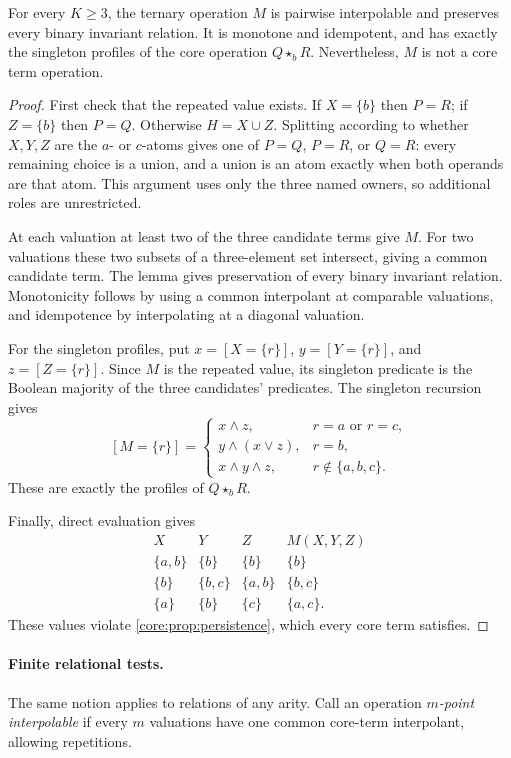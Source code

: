 \begin{theorem}\label{core:thm:pairwise-obstruction}
For every $K\geq3$, the ternary operation $M$ is pairwise interpolable
and preserves every binary invariant relation. It is monotone and
idempotent, and has exactly the singleton profiles of the core operation
$Q\star_bR$. Nevertheless, $M$ is not a core term operation.
\end{theorem}
\begin{proof}
First check that the repeated value exists. If $X=\{b\}$ then $P=R$;
if $Z=\{b\}$ then $P=Q$. Otherwise $H=X\cup Z$. Splitting according
to whether $X,Y,Z$ are the $a$- or $c$-atoms gives one of $P=Q$,
$P=R$, or $Q=R$: every remaining choice is a union, and a union is
an atom exactly when both operands are that atom. This argument uses
only the three named owners, so additional roles are unrestricted.

At each valuation at least two of the three candidate terms give $M$.
For two valuations these two subsets of a three-element set intersect,
giving a common candidate term. The lemma gives preservation of every
binary invariant relation. Monotonicity follows by using a common
interpolant at comparable valuations, and idempotence by interpolating
at a diagonal valuation.

For the singleton profiles, put $x=[X=\{r\}]$, $y=[Y=\{r\}]$,
and $z=[Z=\{r\}]$. Since $M$ is the repeated value, its singleton
predicate is the Boolean majority of the three candidates' predicates.
The singleton recursion gives
\[
 [M=\{r\}]=\begin{cases}
 x\land z,&r=a\text{ or }r=c,\\
 y\land(x\lor z),&r=b,\\
 x\land y\land z,&r\notin\{a,b,c\}.
 \end{cases}
\]
These are exactly the profiles of $Q\star_bR$.

Finally, direct evaluation gives
\[
\begin{array}{c|c|c|c}
 X&Y&Z&M(X,Y,Z)\\\hline
 \{a,b\}&\{b\}&\{b\}&\{b\}\\
 \{b\}&\{b,c\}&\{a,b\}&\{b,c\}\\
 \{a\}&\{b\}&\{c\}&\{a,c\}.
\end{array}
\]
These values violate \cref{core:prop:persistence}, which every core term
satisfies.
\end{proof}

\paragraph{Finite relational tests.}
The same notion applies to relations of any arity. Call an operation
\emph{$m$-point interpolable} if every $m$ valuations have one common
core-term interpolant, allowing repetitions.

